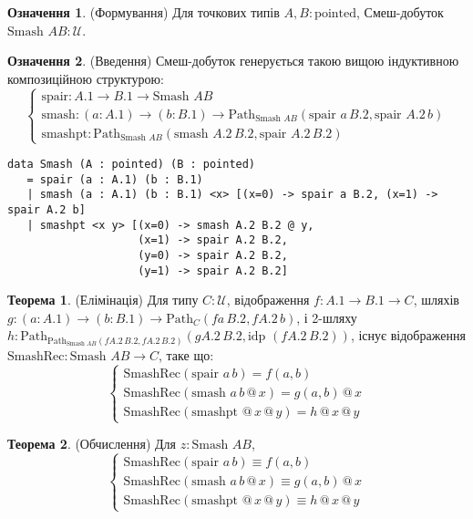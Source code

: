 \documentclass{article}
\theoremstyle{definition}
\newtheorem{theorem}{Теорема}
\newtheorem{definition}{Означення}
\begin{document}
\begin{definition} (Формування)
Для точкових типів \( A, B : \text{pointed} \), Смеш-добуток \( \text{Smash } A B : \mathcal{U} \).
\end{definition}

\begin{definition} (Введення)
Смеш-добуток генерується такою вищою індуктивною композиційною структурою:
\[
\begin{cases}
\text{spair} : A.1 \to B.1 \to \text{Smash } A B \\
\text{smash} : (a : A.1) \to (b : B.1) \to \text{Path}_{\text{Smash } A B} (\text{spair } a \, B.2, \text{spair } A.2 \, b) \\
\text{smashpt} : \text{Path}_{\text{Smash } A B} (\text{smash } A.2 \, B.2, \text{spair } A.2 \, B.2)
\end{cases}
\]
\begin{lstlisting}
data Smash (A : pointed) (B : pointed)
   = spair (a : A.1) (b : B.1)
   | smash (a : A.1) (b : B.1) <x> [(x=0) -> spair a B.2, (x=1) -> spair A.2 b]
   | smashpt <x y> [(x=0) -> smash A.2 B.2 @ y,
                    (x=1) -> spair A.2 B.2,
                    (y=0) -> spair A.2 B.2,
                    (y=1) -> spair A.2 B.2]
\end{lstlisting}
\end{definition}

\begin{theorem} (Елімінація)
Для типу \( C : \mathcal{U} \), відображення \( f : A.1 \to B.1 \to C \),
шляхів \( g : (a : A.1) \to (b : B.1) \to \text{Path}_C (f a \, B.2, f A.2 \, b) \),
і 2-шляху \( h : \text{Path}_{\text{Path}_{\text{Smash } A B} (f A.2 \, B.2, f A.2 \, B.2)} (g A.2 \, B.2, \text{idp } (f A.2 \, B.2)) \),
існує відображення \( \text{SmashRec} : \text{Smash } A B \to C \), таке що:
\[
\begin{cases}
\text{SmashRec}(\text{spair } a \, b) = f(a, b) \\
\text{SmashRec}(\text{smash } a \, b \, @ \, x) = g(a, b) \, @ \, x \\
\text{SmashRec}(\text{smashpt } @ \, x \, @ \, y) = h \, @ \, x \, @ \, y
\end{cases}
\]
\end{theorem}

\begin{theorem} (Обчислення)
Для \( z : \text{Smash } A B \),
\[
\begin{cases}
\text{SmashRec}(\text{spair } a \, b) \equiv f(a, b) \\
\text{SmashRec}(\text{smash } a \, b \, @ \, x) \equiv g(a, b) \, @ \, x \\
\text{SmashRec}(\text{smashpt } @ \, x \, @ \, y) \equiv h \, @ \, x \, @ \, y
\end{cases}
\]
\end{theorem}
\end{document}
